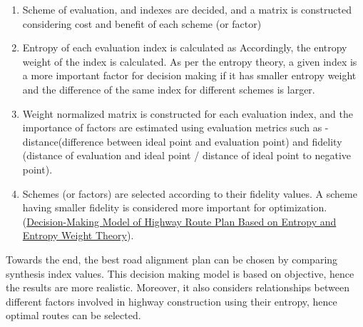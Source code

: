 \begin{enumerate}
\item Scheme of evaluation, and indexes are decided, and a matrix is constructed considering cost and benefit of each scheme (or factor)
\item Entropy of each evaluation index is calculated as
Accordingly, the entropy weight of the index is calculated.
As per the entropy theory, a given index is a more important factor for decision making if it has smaller entropy weight and the difference of the same index for different schemes is larger.
\item Weight normalized matrix is constructed for each evaluation index, and the importance of factors are estimated using evaluation metrics such as - distance(difference between ideal point and evaluation point) and fidelity (distance of evaluation and ideal point / distance of ideal point to negative point).
\item Schemes (or factors) are selected according to their fidelity values. A scheme having smaller fidelity is considered more important for optimization. (\href{https://ascelibrary.org/doi/10.1061/41042%28349%2916}{Decision-Making Model of Highway Route Plan Based on Entropy and Entropy Weight Theory}).
\end{enumerate}
Towards the end, the best road alignment plan can be chosen by comparing synthesis index values. This decision making model is based on objective, hence the results are more realistic. Moreover, it also considers relationships between different factors involved in highway construction using their entropy, hence optimal routes can be selected.

